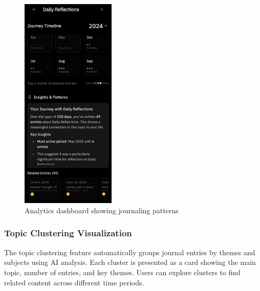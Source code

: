 \begin{figure}[H]
\centering
\includegraphics[width=0.4\textwidth]{files/imgs/prototype/analytics_screen.jpeg}
\caption{Analytics dashboard showing journaling patterns}
\label{fig:analytics-screen}
\end{figure}

\subsubsection{Topic Clustering Visualization}

The topic clustering feature automatically groups journal entries by themes and subjects using AI analysis. Each cluster is presented as a card showing the main topic, number of entries, and key themes. Users can explore clusters to find related content across different time periods.

